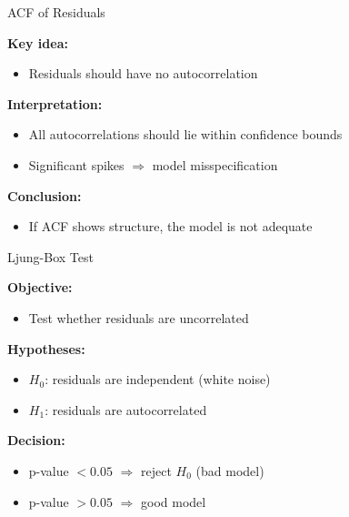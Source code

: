 \documentclass[aspectratio=169]{beamer}
\begin{document}
\begin{frame}{ACF of Residuals}

\textbf{Key idea:}
\begin{itemize}
    \item Residuals should have no autocorrelation
\end{itemize}

\vspace{0.4cm}

\textbf{Interpretation:}
\begin{itemize}
    \item All autocorrelations should lie within confidence bounds
    \item Significant spikes $\Rightarrow$ model misspecification
\end{itemize}

\vspace{0.4cm}

\textbf{Conclusion:}
\begin{itemize}
    \item If ACF shows structure, the model is not adequate
\end{itemize}

\end{frame}


\begin{frame}{Ljung-Box Test}

\textbf{Objective:}
\begin{itemize}
    \item Test whether residuals are uncorrelated
\end{itemize}

\vspace{0.4cm}

\textbf{Hypotheses:}
\begin{itemize}
    \item $H_0$: residuals are independent (white noise)
    \item $H_1$: residuals are autocorrelated
\end{itemize}

\vspace{0.4cm}

\textbf{Decision:}
\begin{itemize}
    \item p-value $< 0.05$ $\Rightarrow$ reject $H_0$ (bad model)
    \item p-value $> 0.05$ $\Rightarrow$ good model
\end{itemize}

\end{frame}
\end{document}
